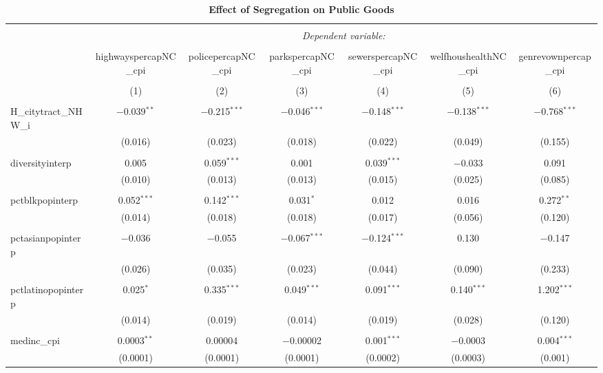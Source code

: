\documentclass[]{article}
\begin{document}
\begin{sidewaystable}[!htbp] \centering 
  \caption{\textbf{Effect of Segregation on Public Goods}} 
  \label{} 
\begin{tabular}{@{\extracolsep{5pt}}lcccccc} 
\\[-1.8ex]\hline 
\hline \\[-1.8ex] 
 & \multicolumn{6}{c}{\textit{Dependent variable:}} \\ 
\cline{2-7} 
\\[-1.8ex] & highwayspercapNC\_cpi & policepercapNC\_cpi & parkspercapNC\_cpi & sewerspercapNC\_cpi & welfhoushealthNC\_cpi & genrevownpercap\_cpi \\ 
\\[-1.8ex] & (1) & (2) & (3) & (4) & (5) & (6)\\ 
\hline \\[-1.8ex] 
 H\_citytract\_NHW\_i & $-$0.039$^{**}$ & $-$0.215$^{***}$ & $-$0.046$^{***}$ & $-$0.148$^{***}$ & $-$0.138$^{***}$ & $-$0.768$^{***}$ \\ 
  & (0.016) & (0.023) & (0.018) & (0.022) & (0.049) & (0.155) \\ 
  & & & & & & \\ 
 diversityinterp & 0.005 & 0.059$^{***}$ & 0.001 & 0.039$^{***}$ & $-$0.033 & 0.091 \\ 
  & (0.010) & (0.013) & (0.013) & (0.015) & (0.025) & (0.085) \\ 
  & & & & & & \\ 
 pctblkpopinterp & 0.052$^{***}$ & 0.142$^{***}$ & 0.031$^{*}$ & 0.012 & 0.016 & 0.272$^{**}$ \\ 
  & (0.014) & (0.018) & (0.018) & (0.017) & (0.056) & (0.120) \\ 
  & & & & & & \\ 
 pctasianpopinterp & $-$0.036 & $-$0.055 & $-$0.067$^{***}$ & $-$0.124$^{***}$ & 0.130 & $-$0.147 \\ 
  & (0.026) & (0.035) & (0.023) & (0.044) & (0.090) & (0.233) \\ 
  & & & & & & \\ 
 pctlatinopopinterp & 0.025$^{*}$ & 0.335$^{***}$ & 0.049$^{***}$ & 0.091$^{***}$ & 0.140$^{***}$ & 1.202$^{***}$ \\ 
  & (0.014) & (0.019) & (0.014) & (0.019) & (0.028) & (0.120) \\ 
  & & & & & & \\ 
 medinc\_cpi & 0.0003$^{**}$ & 0.00004 & $-$0.00002 & 0.001$^{***}$ & $-$0.0003 & 0.004$^{***}$ \\ 
  & (0.0001) & (0.0001) & (0.0001) & (0.0002) & (0.0003) & (0.001) \\ 

\end{tabular}
\end{sidewaystable}
\end{document}
